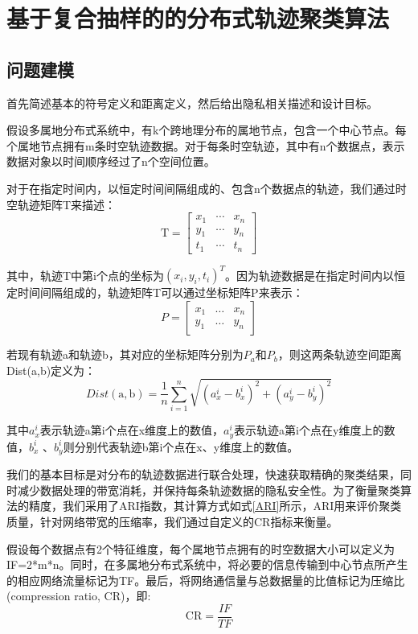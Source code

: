 \section{基于复合抽样的的分布式轨迹聚类算法}

\subsection{问题建模}
首先简述基本的符号定义和距离定义，然后给出隐私相关描述和设计目标。

假设多属地分布式系统中，有k个跨地理分布的属地节点，包含一个中心节点。每个属地节点拥有m条时空轨迹数据。对于每条时空轨迹，其中有n个数据点，表示数据对象以时间顺序经过了n个空间位置。

对于在指定时间内，以恒定时间间隔组成的、包含n个数据点的轨迹，我们通过时空轨迹矩阵T来描述：
\[
\mathrm{T}=\left[\begin{array}{lll}
{x_{1}} & {\cdots} & {x_{n}} \\
{y_{1}} & {\cdots} & {y_{n}} \\
{t_{1}} & {\cdots} & {t_{n}}
\end{array}\right]
\]

其中，轨迹T中第i个点的坐标为$(x_i,y_i,t_i)^T$。因为轨迹数据是在指定时间内以恒定时间间隔组成的，轨迹矩阵T可以通过坐标矩阵P来表示：
\[
P=\left[\begin{array}{lll}
{x_{1}} & {\dots} & {x_{n}} \\
{y_{1}} & {\dots} & {y_{n}}
\end{array}\right]
\]

若现有轨迹a和轨迹b，其对应的坐标矩阵分别为$P_a$和$P_b$，则这两条轨迹空间距离Dist(a,b)定义为：
\begin{equation}
\label{ch3dist}
Dist(\mathrm{a}, \mathrm{b})=\frac{1}{n} \sum_{i=1}^{n} \sqrt{\left(a_{x}^{i}-b_{x}^{i}\right)^{2}+\left(a_{y}^{i}-b_{y}^{i}\right)^{2}}
\end{equation}

其中$a_x^i$表示轨迹a第i个点在x维度上的数值，$a_y^i$表示轨迹a第i个点在y维度上的数值，$b_x^i$ 、$b_y^i$则分别代表轨迹b第i个点在x、y维度上的数值。	

我们的基本目标是对分布的轨迹数据进行联合处理，快速获取精确的聚类结果，同时减少数据处理的带宽消耗，并保持每条轨迹数据的隐私安全性。为了衡量聚类算法的精度，我们采用了ARI指数，其计算方式如式\ref{ARI}所示，ARI用来评价聚类质量，针对网络带宽的压缩率，我们通过自定义的CR指标来衡量。

假设每个数据点有2个特征维度，每个属地节点拥有的时空数据大小可以定义为IF=2*m*n。同时，在多属地分布式系统中，将必要的信息传输到中心节点所产生的相应网络流量标记为TF。最后，将网络通信量与总数据量的比值标记为压缩比(compression ratio, CR)，即:
\begin{equation}
\label{CR}
\mathrm{CR}=\frac{I F}{T F}
\end{equation}

